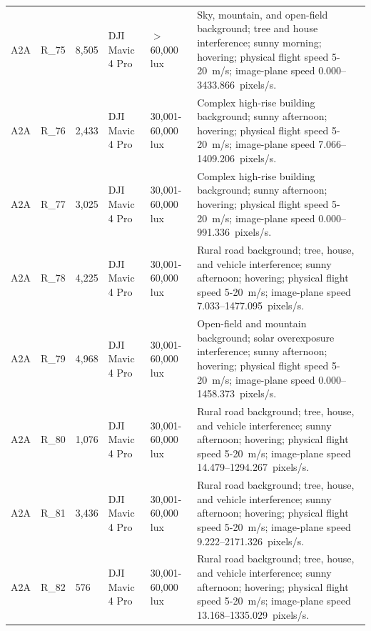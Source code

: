 \begin{longtable}{@{}C{0.045\textwidth} C{0.083\textwidth} C{0.075\textwidth} C{0.13\textwidth} C{0.15\textwidth} L{0.48\textwidth}@{}}
A2A & R\_75 & 8,505 & DJI Mavic 4 Pro & $>$60,000 lux & Sky, mountain, and open-field background; tree and house interference; sunny morning; hovering; physical flight speed 5-20~m/s; image-plane speed 0.000--3433.866~pixels/s. \\

A2A & R\_76 & 2,433 & DJI Mavic 4 Pro & 30,001-60,000 lux & Complex high-rise building background; sunny afternoon; hovering; physical flight speed 5-20~m/s; image-plane speed 7.066--1409.206~pixels/s. \\

A2A & R\_77 & 3,025 & DJI Mavic 4 Pro & 30,001-60,000 lux & Complex high-rise building background; sunny afternoon; hovering; physical flight speed 5-20~m/s; image-plane speed 0.000--991.336~pixels/s. \\

A2A & R\_78 & 4,225 & DJI Mavic 4 Pro & 30,001-60,000 lux & Rural road background; tree, house, and vehicle interference; sunny afternoon; hovering; physical flight speed 5-20~m/s; image-plane speed 7.033--1477.095~pixels/s. \\

A2A & R\_79 & 4,968 & DJI Mavic 4 Pro & 30,001-60,000 lux & Open-field and mountain background; solar overexposure interference; sunny afternoon; hovering; physical flight speed 5-20~m/s; image-plane speed 0.000--1458.373~pixels/s. \\

A2A & R\_80 & 1,076 & DJI Mavic 4 Pro & 30,001-60,000 lux & Rural road background; tree, house, and vehicle interference; sunny afternoon; hovering; physical flight speed 5-20~m/s; image-plane speed 14.479--1294.267~pixels/s. \\

A2A & R\_81 & 3,436 & DJI Mavic 4 Pro & 30,001-60,000 lux & Rural road background; tree, house, and vehicle interference; sunny afternoon; hovering; physical flight speed 5-20~m/s; image-plane speed 9.222--2171.326~pixels/s. \\

A2A & R\_82 & 576 & DJI Mavic 4 Pro & 30,001-60,000 lux & Rural road background; tree, house, and vehicle interference; sunny afternoon; hovering; physical flight speed 5-20~m/s; image-plane speed 13.168--1335.029~pixels/s. \\

\end{longtable}
\endgroup